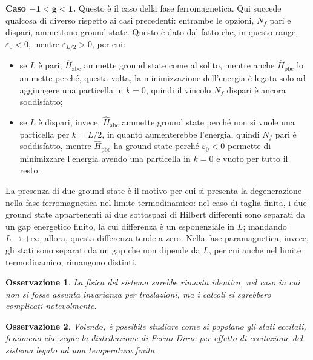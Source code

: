 \documentclass[11pt, a4paper]{scrartcl}
\theoremstyle{style}
\newtheorem{osservazione}{Osservazione}[section]
\theoremstyle{style1}
\numberwithin{equation}{subsection}
\begin{document}
\textbf{Caso $\mathbf{-1 < g< 1} $.} Questo \`e il caso della fase ferromagnetica.
Qui succede qualcosa di diverso rispetto ai casi precedenti: entrambe le opzioni, $N_f$ pari e dispari, ammettono ground state.
Questo \`e dato dal fatto che, in questo range, $\varepsilon _0 < 0$, mentre $\varepsilon _{L / 2} > 0$, per cui:
\begin{itemize}
	\item se $L$ \`e pari, $\hat{H}_\text{abc}$ ammette ground state come al solito, mentre anche $\hat{H}_\text{pbc}$ lo ammette perch\'e, questa volta, la minimizzazione dell'energia \`e legata solo ad aggiungere una particella in $k=0$, quindi il vincolo $N_f$ dispari \`e ancora soddisfatto;
	\item se $L$ \`e dispari, invece, $\hat{H}_\text{abc}$ ammette ground state perch\'e non si vuole una particella per $k = L / 2$, in quanto aumenterebbe l'energia, quindi $N_f$ pari \`e soddisfatto, mentre $\hat{H}_\text{pbc}$ ha ground state perch\'e $\varepsilon _0 < 0 $ permette di minimizzare l'energia avendo una particella in $k=0$ e vuoto per tutto il resto.
\end{itemize}
\vspace{.5cm}
La presenza di due ground state \`e il motivo per cui si presenta la degenerazione nella fase ferromagnetica nel limite termodinamico: nel caso di taglia finita, i due ground state appartenenti ai due sottospazi di Hilbert differenti sono separati da un gap energetico finito, la cui differenza \`e un esponenziale in $L$; mandando $L\to +\infty$, allora, questa differenza tende a zero.
Nella fase paramagnetica, invece, gli stati sono separati da un gap che non dipende da $L$, per cui anche nel limite termodinamico, rimangono distinti.
\begin{osservazione}
La fisica del sistema sarebbe rimasta identica, nel caso in cui non si fosse assunta invarianza per traslazioni, ma i calcoli si sarebbero complicati notevolmente.
\end{osservazione}
\begin{osservazione}
Volendo, \`e possibile studiare come si popolano gli stati eccitati, fenomeno che segue la distribuzione di Fermi-Dirac per effetto di eccitazione del sistema legato ad una temperatura finita.
\end{osservazione}
\end{document}
